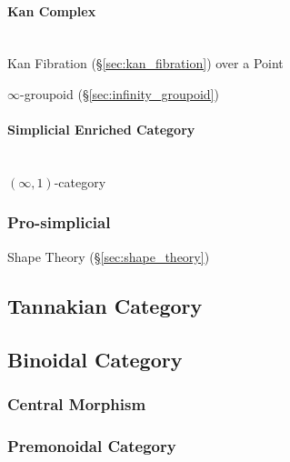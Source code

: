 \paragraph{Kan Complex}\label{sec:kan_complex}
\hfill \\

Kan Fibration (\S\ref{sec:kan_fibration}) over a Point

$\infty$-groupoid (\S\ref{sec:infinity_groupoid})



\paragraph{Simplicial Enriched Category}
\label{sec:simplicial_enriched}
\hfill \\

$(\infty,1)$-category %



\subsubsection{Pro-simplicial}\label{sec:pro_simplicial}

Shape Theory (\S\ref{sec:shape_theory})



\subsection{Tannakian Category}\label{sec:tannakian_category}

\subsection{Binoidal Category}\label{sec:binoidal_category}

\subsubsection{Central Morphism}\label{sec:central_morphism}

\subsubsection{Premonoidal Category}\label{sec:premonoidal_category}

